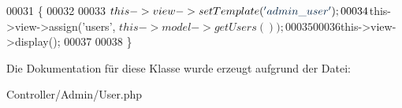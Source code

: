 \begin{DoxyCode}
00031                                        \{
00032                 
00033                 $this->view->setTemplate(\textcolor{stringliteral}{'admin\_user'});
00034                 $this->view->assign(\textcolor{stringliteral}{'users'}, $this->model->getUsers());
00035                 
00036                 $this->view->display();
00037                 
00038         \}       
\end{DoxyCode}


Die Dokumentation für diese Klasse wurde erzeugt aufgrund der Datei\-:\begin{DoxyCompactItemize}
\item 
Controller/\-Admin/\-User.\-php\end{DoxyCompactItemize}
